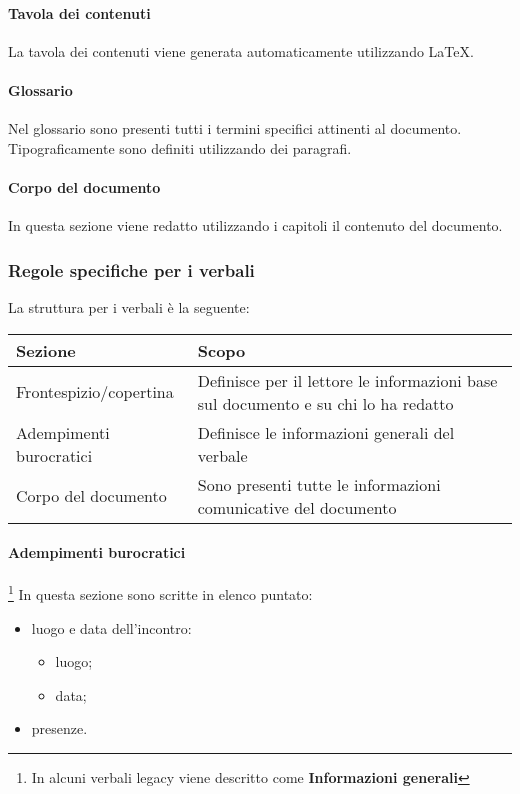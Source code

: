 \paragraph{Tavola dei contenuti} La tavola dei contenuti viene generata automaticamente utilizzando \LaTeX.

\paragraph{Glossario} Nel glossario sono presenti tutti i termini specifici attinenti al documento. Tipograficamente sono definiti utilizzando dei paragrafi.

\paragraph{Corpo del documento} In questa sezione viene redatto utilizzando i capitoli il contenuto del documento.

\subsubsection{Regole specifiche per i verbali}

La struttura per i verbali è la seguente:

\begin{center}
    \begin{tabularx}{\linewidth}{l | X }            
        \textbf{Sezione} & \textbf{Scopo}\\
        \hline
        Frontespizio/copertina & Definisce per il lettore le informazioni base sul documento e su chi lo ha redatto\\
        Adempimenti burocratici & Definisce le informazioni generali del verbale\\
        Corpo del documento & Sono presenti tutte le informazioni comunicative del documento\\
    \end{tabularx}
\end{center}

\paragraph{Adempimenti burocratici}\footnote{In alcuni verbali legacy viene descritto come \textbf{Informazioni generali}} In questa sezione sono scritte in elenco puntato:

\begin{itemize}
    \item luogo e data dell'incontro:
	\begin{itemize}
		\item luogo;
		\item data;
	\end{itemize}
	\item presenze.
\end{itemize}

